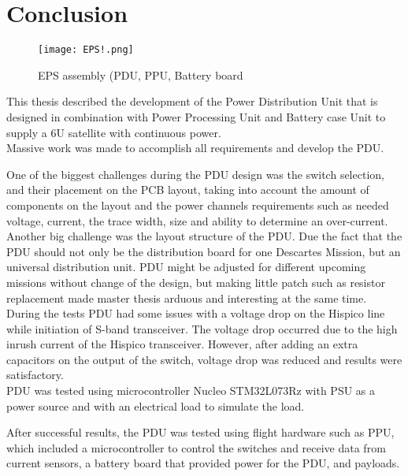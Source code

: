 \chapter{Conclusion\label{cha:chapter7}}

 \begin{figure}[h]
 	\centering
 	\texttt{[image: EPS!.png]}
 	\caption{EPS assembly (PDU, PPU, Battery board}
 	\label{fig: EPS!}
 \end{figure}

This thesis described the development of the Power Distribution Unit that is designed in combination with Power Processing Unit and Battery case Unit to supply a 6U satellite with  continuous power.\\  


Massive work was made to accomplish all requirements and develop the PDU.
 

 One of the biggest challenges during the PDU design was the switch selection, and their placement on the PCB layout, taking into account the amount of components on the layout and the power channels requirements such as needed voltage, current, the trace width, size and ability to determine an over-current. Another big challenge was the layout structure of the PDU. Due the fact that the PDU should not only be the distribution board for one Descartes Mission, but an universal distribution unit. PDU might be adjusted for different upcoming missions without change of the design, but making little patch such as resistor replacement made master thesis arduous and interesting at the same time. During the tests PDU had some issues with a voltage drop on the Hispico line while initiation of S-band transceiver. The voltage drop occurred due to the high inrush current of the Hispico transceiver.    However, after adding an extra capacitors on the output of the switch, voltage drop was reduced and results were satisfactory.    \\

PDU was tested using microcontroller Nucleo STM32L073Rz with PSU as a power source and with an electrical load to simulate the load. 

After successful results, the PDU was tested using flight hardware such as PPU, which included a microcontroller to control the switches and receive data from current sensors, a battery board that provided power for the PDU, and payloads. 

